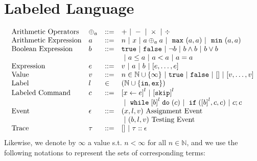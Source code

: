 \section{Labeled Language}
\label{sec:psRB-language-syntax}
\[
\begin{array}{llll}
\mbox{Arithmetic Operators} 
& \oplus_a & ::= & + ~|~ - ~|~ \times 
%
~|~ \div
\\  
\mbox{Arithmetic Expression} 
& \aexpr & ::= & 
n ~|~ {x} ~|~ \aexpr \oplus_a \aexpr  ~|~ \emax (a, a) ~|~ \emin(a, a)
\\
\mbox{Boolean Expression} & \bexpr & ::= & 
%
\etrue ~|~ \efalse  ~|~ \neg \bexpr
 ~|~ \bexpr \land \bexpr
%
~|~ \bexpr \lor \bexpr 
\\
& & &
~|~ \aexpr \leq \aexpr 
~|~ \aexpr < \aexpr 
~|~ \aexpr = \aexpr 
\\
\mbox{Expression} & \expr & ::= & v ~|~ \aexpr ~|~ \bexpr ~|~ [\expr, \dots, \expr]
\\  
%
\mbox{Value} 
& v & ::= & { n \in \mathbb{N} \cup \{\infty\} ~|~ \etrue ~|~ \efalse ~|~ [] ~|~ [v, \dots, v]} \\
%
\mbox{Label} 
& l & \in & (\mathbb{N} \cup \{\lin, \lex\}) 
\\ 
%
\mbox{Labeled Command} 
& {c} & ::= &  
\clabel{\assign{x}{\expr}}^l 
~|~  \clabel{\eskip}^l 
\\
& & &
~|~ \ewhile \clabel{\bexpr}^{l} \edo ({c})
~|~ \eif(\clabel{\bexpr}^{l} , {c}, {c}) 
~|~ {c};{c}  
\\ 
\mbox{Event} 
& \event & ::= & 
({x}, l, v) ~ \mbox{Assignment Event} 
\\
&&& 
~|~(\bexpr, l, v) ~ \mbox{Testing Event}
\\
\mbox{Trace} & \trace
& ::= & [] ~|~ \trace :: \event
\\
\end{array}
\]
Likewise, we denote by $\infty$ a value s.t. $n < \infty $ for all $n \in \mathbb{N}$, and we use the following notations to represent the sets of corresponding terms:

